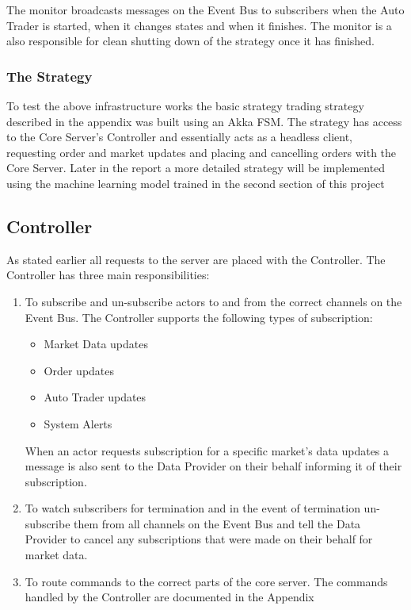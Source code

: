 			The monitor broadcasts messages on the Event Bus to subscribers when the Auto Trader is started, when it changes states and when it finishes. The monitor is a also responsible for clean shutting down of the strategy once it has finished.
			
		\subsubsection{The Strategy}
			To test the above infrastructure works the basic strategy trading strategy described in the appendix was built using an Akka FSM. The strategy has access to the Core Server's Controller and essentially acts as a headless client, requesting order and market updates and placing and cancelling orders with the Core Server. Later in the report a more detailed strategy will be implemented using the machine learning model trained in the second section of this project
				
						
	\subsection{Controller}
		As stated earlier all requests to the server are placed with the Controller. The Controller has three main responsibilities: 

		\begin{enumerate}
			\item To subscribe and un-subscribe actors to and from the correct channels on the Event Bus. The Controller supports the following types of subscription:
				\begin{itemize}
					\item Market Data updates
					\item Order updates
					\item Auto Trader updates
					\item System Alerts				
				\end{itemize}
				When an actor requests subscription for a specific market's data updates a message is also sent to the Data Provider on their behalf informing it of their subscription.
			\item To watch subscribers for termination and in the event of termination un-subscribe them from all channels on the Event Bus and tell the Data Provider to cancel any subscriptions that were made on their behalf for market data.
			\item To route commands to the correct parts of the core server. The commands handled by the Controller are documented in the Appendix
		\end{enumerate}				

